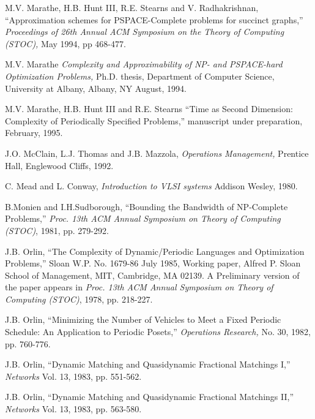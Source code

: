 \begin{thebibliography}{HMRR93}
  M.V. Marathe, H.B. Hunt III, 
R.E. Stearns and V. Radhakrishnan,
``Approximation schemes for
PSPACE-Complete problems for succinct graphs,'' 
{\em Proceedings of 26th Annual ACM
Symposium on the Theory of Computing (STOC),} May 1994,
pp 468-477.




 M.V. Marathe
{\em Complexity and Approximability of NP- and PSPACE-hard Optimization
Problems,}
Ph.D. thesis, Department of Computer Science, 
University at Albany,  Albany, NY August, 1994.


 M.V. Marathe, H.B. Hunt III and R.E. Stearns 
``Time as  Second Dimension: Complexity of Periodically Specified Problems,''
manuscript under preparation,
February, 1995.





 J.O. McClain, L.J. Thomas and J.B. Mazzola,
{\em Operations Management,}
Prentice Hall, Englewood Cliffs, 1992.

 C. Mead and L. Conway,
{\em Introduction to VLSI systems}
Addison Wesley, 1980.




 B.Monien and I.H.Sudborough, 
``Bounding the Bandwidth of NP-Complete Problems,''
{\em Proc. 13th ACM Annual Symposium on Theory of Computing (STOC)},
1981, pp. 279-292.






 J.B. Orlin,
``The Complexity of Dynamic/Periodic Languages and Optimization Problems,''
Sloan W.P. No. 1679-86 July 1985,
Working paper, Alfred P. Sloan School of Management,
MIT, Cambridge, MA 02139. A Preliminary version of the paper appears in
{\em Proc. 13th ACM Annual Symposium on Theory of Computing (STOC)}, 
1978, pp. 218-227.





 J.B. Orlin,
``Minimizing the Number of Vehicles to Meet a Fixed Periodic Schedule:
An Application to Periodic Posets,''
{\em Operations Research,}
No. 30, 1982, pp. 760-776.




 J.B. Orlin,
``Dynamic Matching and Quasidynamic Fractional Matchings I,''
{\em Networks}
Vol. 13,  1983, pp. 551-562.


 J.B. Orlin,
``Dynamic Matching and Quasidynamic Fractional Matchings II,''
{\em Networks}
Vol. 13,  1983, pp. 563-580.



\end{thebibliography}

